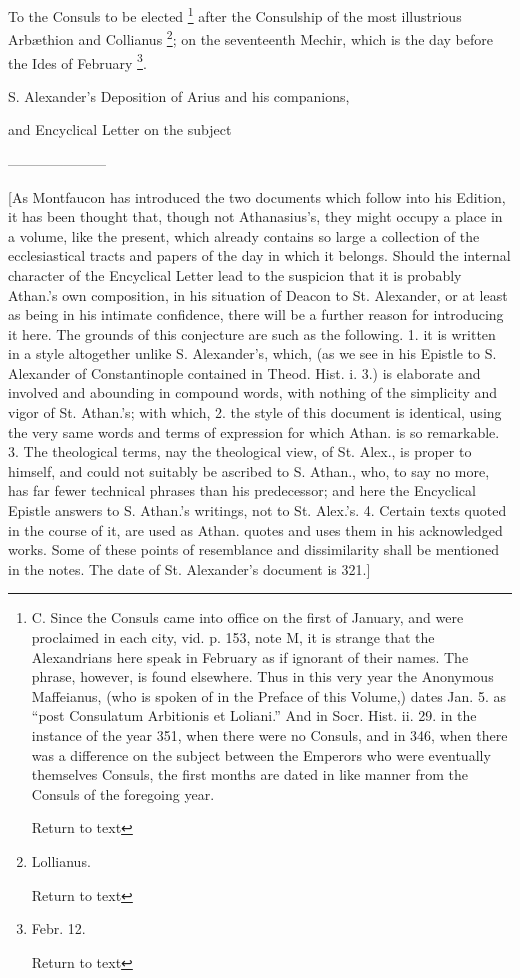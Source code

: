To the Consuls to be elected \footnote{C. Since the Consuls came into office on the
first of January, and were proclaimed in each city, vid. p. 153, note
M, it is strange that the Alexandrians here speak in February as if
ignorant of their names. The phrase, however, is found elsewhere. Thus
in this very year the Anonymous Maffeianus, (who is spoken of in the
Preface of this Volume,) dates Jan. 5. as ``post Consulatum Arbitionis
et Loliani.'' And in Socr. Hist. ii. 29. in the instance of the year
351, when there were no Consuls, and in 346, when there was a
difference on the subject between the Emperors who were eventually
themselves Consuls, the first months are dated in like manner from the
Consuls of the foregoing year.

Return to text

} after the Consulship
of the most illustrious Arbæthion and Collianus \footnote{Lollianus.

Return to text}; on the
seventeenth Mechir, which is the day before the Ides of February \footnote{Febr. 12.

Return to text}.


S. Alexander's Deposition of Arius
and his companions,

and Encyclical Letter on the subject

———————

[As Montfaucon has introduced the two documents
which follow into his Edition, it has been thought that, though not
Athanasius's, they might occupy a place in a volume, like the present,
which already contains so large a collection of the ecclesiastical
tracts and papers of the day in which it belongs. Should the internal
character of the Encyclical Letter lead to the suspicion that it is
probably Athan.'s own composition, in his situation of Deacon to St.
Alexander, or at least as being in his intimate confidence, there will
be a further reason for introducing it here. The grounds of this
conjecture are such as the following. 1. it is written in a style
altogether unlike S. Alexander's, which, (as we see in his Epistle to
S. Alexander of Constantinople contained in Theod. Hist. i. 3.) is
elaborate and involved and abounding in compound words, with nothing
of the simplicity and vigor of St. Athan.'s; with which, 2. the style
of this document is identical, using the very same words and terms of
expression for which Athan. is so remarkable. 3. The theological
terms, nay the theological view, of St. Alex., is proper to himself,
and could not suitably be ascribed to S. Athan., who, to say no more,
has far fewer technical phrases than his predecessor; and here the
Encyclical Epistle answers to S. Athan.'s writings, not to St. Alex.'s.
4. Certain texts quoted in the course of it, are used as Athan. quotes
and uses them in his acknowledged works. Some of these points of
resemblance and dissimilarity shall be mentioned in the notes. The
date of St. Alexander's document is 321.]

